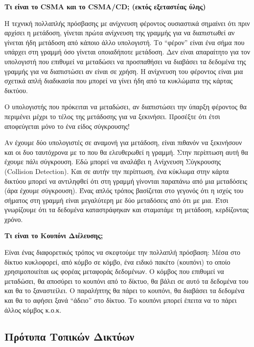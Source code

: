 \begin{inthebox}
\textbf{Τι είναι το CSMA και το CSMA/CD; (εκτός εξεταστέας ύλης)}

Η τεχνική πολλαπλής πρόσβασης με ανίχνευση φέροντος ουσιαστικά σημαίνει ότι πριν αρχίσει η μετάδοση, γίνεται πρώτα ανίχνευση της γραμμής για να διαπιστωθεί αν γίνεται ήδη μετάδοση από κάποιο άλλο υπολογιστή. Το ``φέρον'' είναι ένα σήμα που υπάρχει στη γραμμή όσο γίνεται οποιαδήποτε μετάδοση. Δεν είναι απαραίτητο για τον υπολογιστή που επιθυμεί να μεταδώσει να προσπαθήσει να διαβάσει τα δεδομένα της γραμμής για να διαπιστώσει αν είναι σε χρήση. Η ανίχνευση του φέροντος είναι μια σχετικά απλή διαδικασία που μπορεί να γίνει ήδη από τα κυκλώματα της κάρτας δικτύου.

Ο υπολογιστής που πρόκειται να μεταδώσει, αν διαπιστώσει την ύπαρξη φέροντος θα περιμένει μέχρι το τέλος της μετάδοσης για να ξεκινήσει. Προσέξτε ότι έτσι αποφεύγεται μόνο το ένα είδος σύγκρουσης!

Αν έχουμε δύο υπολογιστές σε αναμονή για μετάδοση, είναι πιθανόν να ξεκινήσουν και οι δυο ταυτόχρονα με το που θα ελευθερωθεί η γραμμή. Στην περίπτωση αυτή θα έχουμε πάλι σύγκρουση. Εδώ μπορεί να αναλάβει η Ανίχνευση Σύγκρουσης (Collision Detection).  Και σε αυτήν την περίπτωση, ένα κύκλωμα στην κάρτα δικτύου μπορεί να αντιληφθεί ότι στη γραμμή γίνονται παραπάνω από μια μεταδόσεις (άρα έχουμε σύγκρουση). Ένας απλός τρόπος βασίζεται στο γεγονός ότι η ισχύς του σήματος στη γραμμή είναι μεγαλύτερη με δύο μεταδόσεις από ότι με μια. Έτσι γνωρίζουμε ότι τα δεδομένα καταστράφηκαν και σταματάμε τη μετάδοση, κερδίζοντας χρόνο.

\textbf{Τι είναι το Κουπόνι Διέλευσης;}

Είναι ένας διαφορετικός τρόπος να σκεφτούμε την πολλαπλή πρόσβαση: Μέσα στο δίκτυο κυκλοφορεί, από κόμβο σε κόμβο, ένα ειδικό πακέτο (κουπόνι) το οποίο χρησιμοποιείται ως φορέας μεταφοράς δεδομένων. Ο κόμβος που επιθυμεί να μεταδώσει, θα αποσύρει το κουπόνι από το δίκτυο, θα βάλει σε αυτό τα δεδομένα του και θα το ξαναστείλει. Ο παραλήπτης θα πάρει το κουπόνι, θα διαβάσει τα δεδομένα και θα το αφήσει ξανά ``άδειο'' στο δίκτυο. Το κουπόνι μπορεί έπειτα να το πάρει άλλος κόμβος κ.ο.κ.\\
\end{inthebox}

\subsection*{Πρότυπα Τοπικών Δικτύων}

